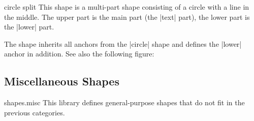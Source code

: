 \begin{shape}{circle split}
  This shape is a multi-part shape consisting of a circle with a line
  in the middle. The upper part is the main part (the |text| part),
  the lower part is the |lower| part.
  
\begin{codeexample}[]
\end{codeexample}

  The shape inherits all anchors from the |circle| shape and defines
  the |lower| anchor in addition. See also the
  following figure:
\begin{codeexample}[]
\Huge
{}
\end{codeexample}
\end{shape}


\subsection{Miscellaneous Shapes}

\begin{pgflibrary}{shapes.misc}
  This library defines general-purpose shapes that do not fit in the
  previous categories.
\end{pgflibrary}



